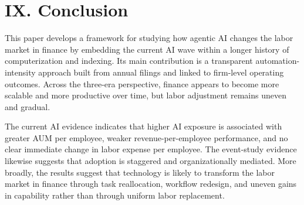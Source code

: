 \documentclass[11pt]{article}
\begin{document}
\section{IX. Conclusion}
This paper develops a framework for studying how agentic AI changes the labor market in finance by embedding the current AI wave within a longer history of computerization and indexing. Its main contribution is a transparent automation-intensity approach built from annual filings and linked to firm-level operating outcomes. Across the three-era perspective, finance appears to become more scalable and more productive over time, but labor adjustment remains uneven and gradual.

The current AI evidence indicates that higher AI exposure is associated with greater AUM per employee, weaker revenue-per-employee performance, and no clear immediate change in labor expense per employee. The event-study evidence likewise suggests that adoption is staggered and organizationally mediated. More broadly, the results suggest that technology is likely to transform the labor market in finance through task reallocation, workflow redesign, and uneven gains in capability rather than through uniform labor replacement.
\end{document}
